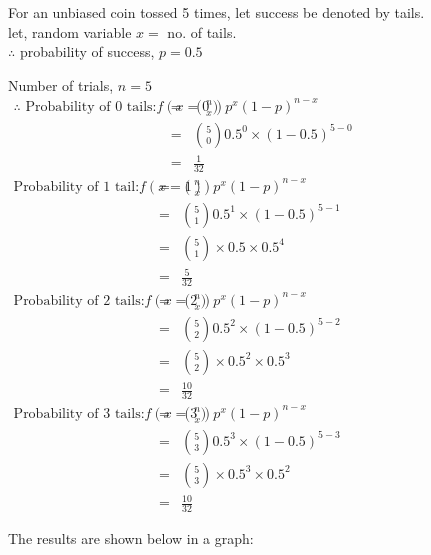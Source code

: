 \documentclass{article}
\begin{document}
\Large{
    For an unbiased coin tossed 5 times, let success be denoted by tails.\\
    let, random variable $x=$ no. of tails.\\
    $\therefore$ probability of success, $p = 0.5$

    \hspace{1em}Number of trials, $n=5$ \\
    \begin{eqnarray*}
        \text{$\therefore$ Probability of 0 tails:} f(x=0) &=& {n \choose x} p^x(1-p)^{n-x}\hspace{10cm}\\
        &=& {5 \choose 0} 0.5^0 \times (1-0.5)^{5-0}\\
        &=& \frac{1}{32}
    \end{eqnarray*}
    \begin{eqnarray*}
        \text{Probability of 1 tail:} f(x=1) &=& {n \choose x} p^x(1-p)^{n-x}\hspace{10cm}\\
        &=& {5 \choose 1} 0.5^1 \times (1-0.5)^{5-1}\\
        &=& {5 \choose 1} \times 0.5 \times 0.5^4\\
        &=& \frac{5}{32}
    \end{eqnarray*}
    \begin{eqnarray*}
        \text{Probability of 2 tails:} f(x=2) &=& {n \choose x} p^x(1-p)^{n-x}\hspace{10cm}\\
        &=& {5 \choose 2} 0.5^2 \times (1-0.5)^{5-2}\\
        &=& {5 \choose 2} \times 0.5^2 \times 0.5^3\\
        &=& \frac{10}{32}
    \end{eqnarray*}
    \begin{eqnarray*}
        \text{Probability of 3 tails:} f(x=3) &=& {n \choose x} p^x(1-p)^{n-x}\hspace{10cm}\\
        &=& {5 \choose 3} 0.5^3 \times (1-0.5)^{5-3}\\
        &=& {5 \choose 3} \times 0.5^3 \times 0.5^2\\
        &=& \frac{10}{32}
    \end{eqnarray*}


    The results are shown below in a graph:
    
}
\end{document}
